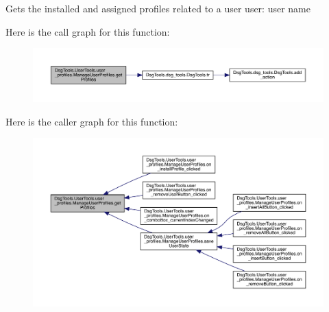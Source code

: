 \begin{DoxyVerb}Gets the installed and assigned profiles related to a user
user: user name
\end{DoxyVerb}
 Here is the call graph for this function\+:
\nopagebreak
\begin{figure}[H]
\begin{center}
\leavevmode
\includegraphics[width=350pt]{class_dsg_tools_1_1_user_tools_1_1user__profiles_1_1_manage_user_profiles_a7a13c12726e9d7a6cb5d4692ab812be0_cgraph}
\end{center}
\end{figure}
Here is the caller graph for this function\+:
\nopagebreak
\begin{figure}[H]
\begin{center}
\leavevmode
\includegraphics[width=350pt]{class_dsg_tools_1_1_user_tools_1_1user__profiles_1_1_manage_user_profiles_a7a13c12726e9d7a6cb5d4692ab812be0_icgraph}
\end{center}
\end{figure}
\mbox{\label{class_dsg_tools_1_1_user_tools_1_1user__profiles_1_1_manage_user_profiles_a7e0fe95a8a424f02874a61d98ae5ea56}} 
